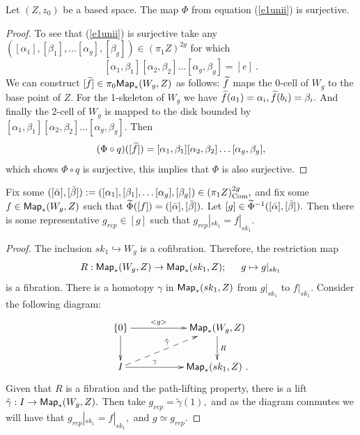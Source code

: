 \begin{lemma} 
Let $(Z, z_{0})$ be a based space. The map $\Phi$ from equation (\ref{e1unii}) is surjective. %
\end{lemma}
\begin{proof}
To see that (\ref{e1unii}) is surjective take any $([\alpha_{1}], [\beta_{1}], \hdots [\alpha_{g}], [\beta_{g}]) \in (\pi_{1}Z)^{2g}$ for which 
\[
[\alpha_{1}, \beta_{1}][\alpha_{2}, \beta_{2}]\hdots[\alpha_{g}, \beta_{g}] = [e]~.
\]
We can construct $[\widetilde f] \in \pi_{0}{\sf Map}_{\ast}(W_{g}, Z)$ as follows:
$\widetilde f$ maps the 0-cell of $W_{g}$ to the base point of $Z.$ For the 1-skeleton of $W_{g}$ we have $\widetilde f(a_{1}) = \alpha_{i}, \widetilde f(b_{i}) = \beta_{i}.$ And finally the 2-cell of $W_{g}$ is mapped to the disk bounded by $[\alpha_{1}, \beta_{1}][\alpha_{2}, \beta_{2}]\hdots[\alpha_{g}, \beta_{g}].$ Then \[
(\Phi \circ q)([\widetilde f]) = [\alpha_{1}, \beta_{1}][\alpha_{2}, \beta_{2}]\hdots[\alpha_{g}, \beta_{g}], 
\]
which shows $\Phi \circ q$ is surjective, this implies that $\Phi$ is also surjective.
\end{proof}


\begin{lemma} \label{rep}
Fix some $([\bar{\alpha}] ,[\bar{\beta}]) := ([\alpha_{1}], [\beta_{1}], \hdots [\alpha_{g}], [\beta_{g}]) \in (\pi_{1}Z)^{2g}_{\rm Com},$ and fix some $f \in {\sf Map}_{\ast}(W_{g}, Z)$ such that $\widetilde{\Phi}([f]) = ([\bar{\alpha}] ,[\bar{\beta}]).$
Let $[g] \in \widetilde{\Phi}^{-1}([\bar{\alpha}] ,[\bar{\beta}]).$ Then there is some representative $g_{rep} \in [g]$ such that $g_{rep}|_{sk_{1}} = f|_{sk_{1}}.$
\end{lemma}
\begin{proof}
The inclusion $sk_{1} \hookrightarrow W_{g}$ is a cofibration. Therefore, the restriction map 
\[
R: {\sf Map}_{\ast}(W_{g}, Z) \rightarrow {\sf Map}_{\ast}(sk_{1}, Z); \hspace{15pt} g \mapsto g|_{sk_{1}}
\]
is a fibration. There is a homotopy $\gamma$ in  ${\sf Map}_{\ast}(sk_{1}, Z)$ from $g|_{sk_{1}}$ to $f|_{sk_{1}}.$ Consider the following diagram:
\[
\xymatrix{
\{0\} \ar[rr]^-{<g>} \ar[d]^-{}
&&
{\sf Map}_{\ast}(W_{g}, Z) \ar[d]^-{R}
\\
I \ar[rr]^-{\gamma} \ar@{-->}[rru]^{\tilde{\gamma}}
&&
{\sf Map}_{\ast}(sk_{1}, Z)~.
}
\]
Given that $R$ is a fibration and the path-lifting property, there is a lift $\tilde{\gamma}: I \rightarrow {\sf Map}_{\ast}(W_{g}, Z).$ Then take $g_{rep} = \tilde{\gamma}(1),$ and as the diagram commutes we will have that $g_{rep}|_{sk_{1}} = f|_{sk_{1}},$ and $g \simeq g_{rep}.$
\end{proof}

